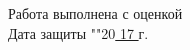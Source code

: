\begin{titlepage}
	Работа выполнена с оценкой \hspace{1cm} \underline{\hspace{8cm}} \\ 
	\vspace{1cm}
	Дата защиты "\underline{\hspace{0.7cm}}"\hspace{0.2cm}\underline{\hspace{2cm}}\hspace{0.2cm}20\underline{ 17 }г.
		
\end{titlepage}